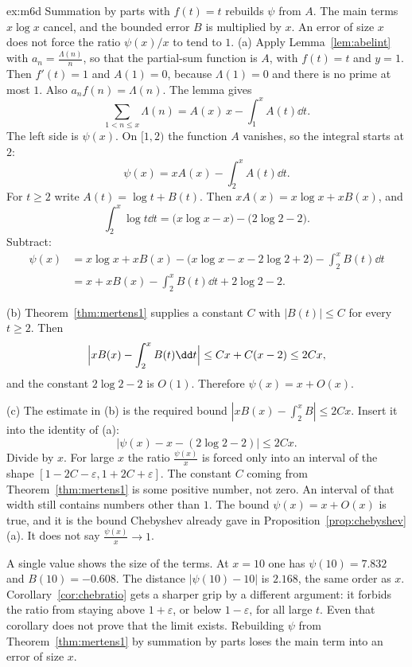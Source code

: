 \begin{solution}{ex:m6d}
\idea Summation by parts with $f(t)=t$ rebuilds $\psi$ from $A$. The main terms $x\log x$ cancel, and the bounded error $B$ is multiplied by $x$. An error of size $x$ does not force the ratio $\psi(x)/x$ to tend to $1$.
\writeup (a) Apply Lemma~\ref{lem:abelint} with $a_n=\frac{\Lambda(n)}n$, so that the partial-sum function is $A$, with $f(t)=t$ and $y=1$. Then $f'(t)=1$ and $A(1)=0$, because $\Lambda(1)=0$ and there is no prime at most $1$. Also $a_nf(n)=\Lambda(n)$. The lemma gives
\[
\sum_{1<n\le x}\Lambda(n)=A(x)\,x-\int_1^x A(t)\dd t.
\]
The left side is $\psi(x)$. On $[1,2)$ the function $A$ vanishes, so the integral starts at $2$:
\[
\psi(x)=xA(x)-\int_2^x A(t)\dd t.
\]
For $t\ge 2$ write $A(t)=\log t+B(t)$. Then $xA(x)=x\log x+xB(x)$, and
\[
\int_2^x\log t\dd t=\bigl(x\log x-x\bigr)-\bigl(2\log 2-2\bigr).
\]
Subtract:
\begin{align*}
\psi(x)
&=x\log x+xB(x)-\bigl(x\log x-x-2\log 2+2\bigr)-\int_2^x B(t)\dd t\\
&=x+xB(x)-\int_2^x B(t)\dd t+2\log 2-2.
\end{align*}

(b) Theorem~\ref{thm:mertens1} supplies a constant $C$ with $|B(t)|\le C$ for every $t\ge 2$. Then
\[
\Bigl|xB(x)-\int_2^x B(t)\dd t\Bigr|\le Cx+C(x-2)\le 2Cx,
\]
and the constant $2\log 2-2$ is $O(1)$. Therefore $\psi(x)=x+O(x)$.

(c) The estimate in (b) is the required bound $|xB(x)-\int_2^x B|\le 2Cx$. Insert it into the identity of (a):
\[
\bigl|\psi(x)-x-(2\log 2-2)\bigr|\le 2Cx.
\]
Divide by $x$. For large $x$ the ratio $\frac{\psi(x)}x$ is forced only into an interval of the shape $[1-2C-\varepsilon,1+2C+\varepsilon]$. The constant $C$ coming from Theorem~\ref{thm:mertens1} is some positive number, not zero. An interval of that width still contains numbers other than $1$. The bound $\psi(x)=x+O(x)$ is true, and it is the bound Chebyshev already gave in Proposition~\ref{prop:chebyshev}(a). It does not say $\frac{\psi(x)}x\to 1$.

A single value shows the size of the terms. At $x=10$ one has $\psi(10)=7.832$ and $B(10)=-0.608$. The distance $|\psi(10)-10|$ is $2.168$, the same order as $x$. Corollary~\ref{cor:chebratio} gets a sharper grip by a different argument: it forbids the ratio from staying above $1+\varepsilon$, or below $1-\varepsilon$, for all large $t$. Even that corollary does not prove that the limit exists. Rebuilding $\psi$ from Theorem~\ref{thm:mertens1} by summation by parts loses the main term into an error of size $x$.
\end{solution}

